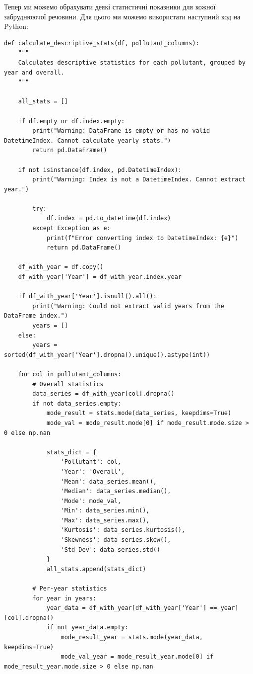 \documentclass{exam_template}
\begin{document}
Тепер ми можемо обрахувати деякі статистичні показники для кожної 
забруднюючої речовини. Для цього ми можемо використати наступний код на Python:
\begin{verbatim}
def calculate_descriptive_stats(df, pollutant_columns):
    """
    Calculates descriptive statistics for each pollutant, grouped by year and overall.
    """
    
    all_stats = []

    if df.empty or df.index.empty:
        print("Warning: DataFrame is empty or has no valid DatetimeIndex. Cannot calculate yearly stats.")
        return pd.DataFrame()

    if not isinstance(df.index, pd.DatetimeIndex):
        print("Warning: Index is not a DatetimeIndex. Cannot extract year.")
        
        try:
            df.index = pd.to_datetime(df.index)
        except Exception as e:
            print(f"Error converting index to DatetimeIndex: {e}")
            return pd.DataFrame()

    df_with_year = df.copy()
    df_with_year['Year'] = df_with_year.index.year

    if df_with_year['Year'].isnull().all():
        print("Warning: Could not extract valid years from the DataFrame index.")
        years = []
    else:
        years = sorted(df_with_year['Year'].dropna().unique().astype(int))

    for col in pollutant_columns:
        # Overall statistics
        data_series = df_with_year[col].dropna()
        if not data_series.empty:
            mode_result = stats.mode(data_series, keepdims=True)
            mode_val = mode_result.mode[0] if mode_result.mode.size > 0 else np.nan

            stats_dict = {
                'Pollutant': col,
                'Year': 'Overall',
                'Mean': data_series.mean(),
                'Median': data_series.median(),
                'Mode': mode_val,
                'Min': data_series.min(),
                'Max': data_series.max(),
                'Kurtosis': data_series.kurtosis(),
                'Skewness': data_series.skew(),
                'Std Dev': data_series.std()
            }
            all_stats.append(stats_dict)

        # Per-year statistics
        for year in years:
            year_data = df_with_year[df_with_year['Year'] == year][col].dropna()
            if not year_data.empty:
                mode_result_year = stats.mode(year_data, keepdims=True)
                mode_val_year = mode_result_year.mode[0] if mode_result_year.mode.size > 0 else np.nan


\end{verbatim}
\end{document}
